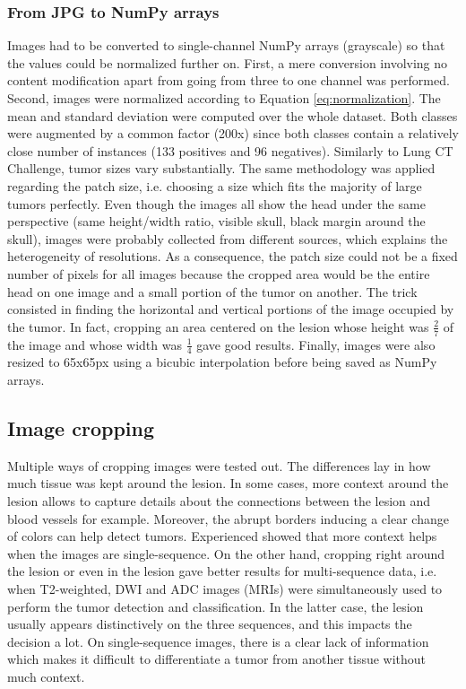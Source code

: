 \subsubsection{From JPG to NumPy arrays}
\setlength{\marginparwidth}{3cm}\leavevmode {}Images had to be converted to single-channel NumPy arrays (grayscale) so that the values could be normalized further on. First, a mere conversion involving no content modification apart from going from three to one channel was performed. Second, images were normalized according to Equation \ref{eq:normalization}. The mean and standard deviation were computed over the whole dataset. Both classes were augmented by a common factor (200x) since both classes contain a relatively close number of instances (133 positives and 96 negatives). Similarly to Lung CT Challenge, tumor sizes vary substantially. The same methodology was applied regarding the patch size, i.e. choosing a size which fits the majority of large tumors perfectly. Even though the images all show the head under the same perspective (same height/width ratio, visible skull, black margin around the skull), images were probably collected from different sources, which explains the heterogeneity of resolutions. As a consequence, the patch size could not be a fixed number of pixels for all images because the cropped area would be the entire head on one image and a small portion of the tumor on another. The trick consisted in finding the horizontal and vertical portions of the image occupied by the tumor. In fact, cropping an area centered on the lesion whose height was $\frac{2}{7}$ of the image and whose width was $\frac{1}{4}$ gave good results. Finally, images were also resized to 65x65px using a bicubic interpolation before being saved as NumPy arrays. 


\subsection{Image cropping}
\setlength{\marginparwidth}{3cm}\leavevmode {}Multiple ways of cropping images were tested out. The differences lay in how much tissue was kept around the lesion. In some cases, more context around the lesion allows to capture details about the connections between the lesion and blood vessels for example. Moreover, the abrupt borders inducing a clear change of colors can help detect tumors. Experienced showed that more context helps when the images are single-sequence. On the other hand, cropping right around the lesion or even in the lesion gave better results for multi-sequence data, i.e. when T2-weighted, DWI and ADC images (MRIs) were simultaneously used to perform the tumor detection and classification. In the latter case, the lesion usually appears distinctively on the three sequences, and this impacts the decision a lot. On single-sequence images, there is a clear lack of information which makes it difficult to differentiate a tumor from another tissue without much context. 


